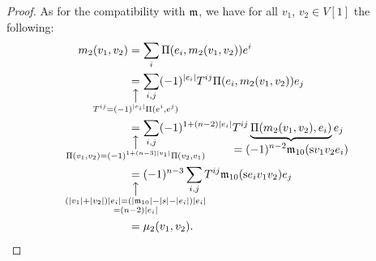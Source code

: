 \documentclass[\MainFolder/Text.tex]{subfiles}
\begin{document}
\begin{proof}
As for the compatibility with $\mathfrak{m}$, we have for all $v_1$, $v_2\in V[1]$ the following:
\begin{equation*}
 \begin{aligned}
  m_2(v_1, v_2) & = \sum_i \Pair(e_i, m_2(v_1,v_2)) e^i \\
 &\underset{\mathclap{\substack{\big\uparrow\rule{0pt}{2.5ex} \\ T^{ij} = (-1)^{\Abs{e_i}} \Pair(e^i,e^j)}}}{=}  \sum_{i,j} (-1)^{\Abs{e_i}} T^{ij} \Pair(e_i,m_2(v_1,v_2))e_j \\
 &\underset{\mathclap{\substack{\big\uparrow\rule{0pt}{2.5ex}\\ \Pair(v_1,v_2) = (-1)^{1+(n-3)\Abs{v_1}} \Pair(v_2,v_1)}}}{=} \sum_{i,j} (-1)^{1 + (n-2)\Abs{e_i}}T^{ij} \underbrace{\Pair(m_2(v_1,v_2),e_i)}_{\displaystyle{\mathclap{=(-1)^{n-2}\MC_{10}(\Susp v_1 v_2 e_i)}}} e_j\\
 & \underset{\mathclap{\substack{\big\uparrow\rule{0pt}{2.5ex} \\  (\Abs{v_1} + \Abs{v_2})\Abs{e_i} =(\Abs{\MC_{10}} - \Abs{s} - \Abs{e_i})\Abs{e_i}\\ = (n-2)\Abs{e_i} }}}{=} (-1)^{n-3} \sum_{i,j} T^{ij} \MC_{10}(\Susp e_i v_1 v_2)e_j \\ 
 &= \mu_2(v_1,v_2).
\end{aligned}
\end{equation*}


\end{proof}
\end{document}
